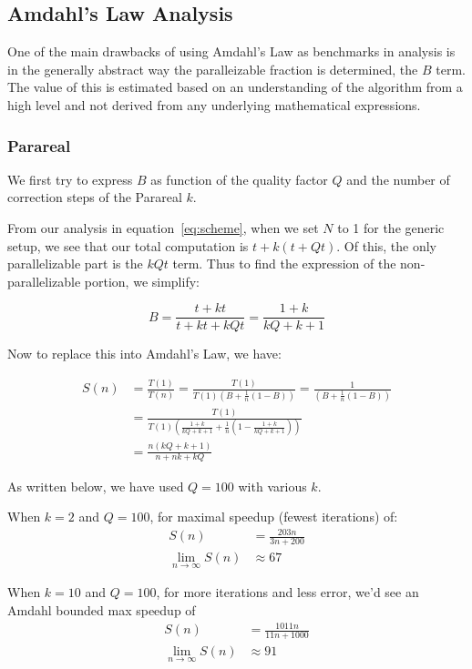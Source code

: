 \documentclass[letterpaper,12pt]{article}
\begin{document}
\subsection{Amdahl's Law Analysis}

One of the main drawbacks of using Amdahl's Law as benchmarks in analysis is in the generally abstract way the paralleizable fraction is determined, the $B$ term. The value of this is estimated based on an understanding of the algorithm from a high level and not derived from any underlying mathematical expressions.

\subsubsection{Parareal}

We first try to express $B$ as function of the quality factor $Q$ and the number of correction steps of the Parareal $k$.

From our analysis in equation~\ref{eq:scheme}, when we set $N$ to 1 for the generic setup, we see that our total computation is $t + k(t+ Qt)$. Of this, the only parallelizable part is the $kQt$ term. Thus to find the expression of the non-parallelizable portion, we simplify:

\[
B = \frac{t+kt}{t+kt+kQt} = \frac{1+k}{kQ+k+1}
\]

Now to replace this into Amdahl's Law, we have:

\[
\begin{aligned}
S(n) &= \frac{T(1)}{T(n)} = \frac{T(1)}{ T(1) \left( B + \frac{1}{n} (1-B) \right)} = \frac{1}{\left( B + \frac{1}{n} (1-B) \right)}\\
       &= \frac{T(1)}{T(1) \left( \frac{1+k}{kQ+k+1} + \frac{1}{n} (1- \frac{1+k}{kQ+k+1}) \right)} \\
       &= \frac{n(kQ+k+1)}{n+nk+kQ}
\end{aligned}
\]

As written below, we have used $Q = 100$ with various $k$.

When $k = 2$ and $Q = 100$, for maximal speedup (fewest iterations) of:
\[
\begin{aligned}
S(n) &= \frac{203n}{3n+200} \\
\lim_{n\to \infty}S(n) &\approx 67
\end{aligned}
\]

When $k = 10$ and $Q = 100$, for more iterations and less error, we'd see an Amdahl bounded max speedup of 
\[
\begin{aligned}
S(n) &= \frac{1011n}{11n+1000} \\
\lim_{n\to \infty}S(n) &\approx 91
\end{aligned}
\]
\end{document}
